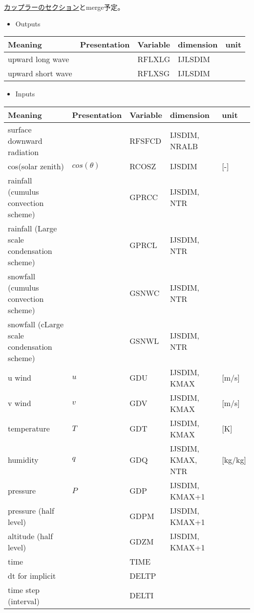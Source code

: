 \href{https://github.com/MIROC-DOC/model_description/blob/coupler_iwakiri/draft/AO-coupler.md}{カップラーのセクション}とmerge予定。

\begin{itemize}
\tightlist
\item
  Outputs
\end{itemize}

\setlength\LTleft{0pt}\setlength\LTright{0pt}\begin{longtable}[]{@{}lllll@{}}
\toprule\relax
Meaning & Presentation & Variable & dimension & unit \\
\midrule\relax
\endhead
upward long wave & & RFLXLG & IJLSDIM & \\
upward short wave & & RFLXSG & IJLSDIM & \\
\bottomrule
\end{longtable}

\begin{itemize}
\tightlist
\item
  Inputs
\end{itemize}

\setlength\LTleft{0pt}\setlength\LTright{0pt}\begin{longtable}[]{@{}lllll@{}}
\toprule\relax
Meaning & Presentation & Variable & dimension & unit \\
\midrule\relax
\endhead
surface downward radiation & & RFSFCD & IJSDIM, NRALB & \\
cos(solar zenith) & \(cos(\theta)\) & RCOSZ & IJSDIM & {[}-{]} \\
rainfall (cumulus convection scheme) & & GPRCC & IJSDIM, NTR & \\
rainfall (Large scale condensation scheme) & & GPRCL & IJSDIM, NTR & \\
snowfall (cumulus convection scheme) & & GSNWC & IJSDIM, NTR & \\
snowfall (cLarge scale condensation scheme) & & GSNWL & IJSDIM, NTR & \\
u wind & \(u\) & GDU & IJSDIM, KMAX & {[}m/s{]} \\
v wind & \(v\) & GDV & IJSDIM, KMAX & {[}m/s{]} \\
temperature & \(T\) & GDT & IJSDIM, KMAX & {[}K{]} \\
humidity & \(q\) & GDQ & IJSDIM, KMAX, NTR & {[}kg/kg{]} \\
pressure & \(P\) & GDP & IJSDIM, KMAX+1 & \\
pressure (half level) & & GDPM & IJSDIM, KMAX+1 & \\
altitude (half level) & & GDZM & IJSDIM, KMAX+1 & \\
time & & TIME & & \\
dt for implicit & & DELTP & & \\
time step (interval) & & DELTI & & \\
\bottomrule
\end{longtable}


